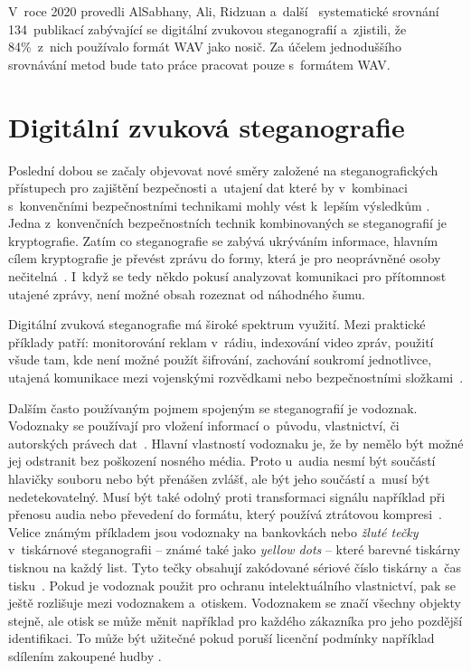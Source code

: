 V~roce 2020 provedli AlSabhany, Ali, Ridzuan a~další~\cite{AlSabhany2020}
systematické srovnání 134~publikací zabývající se digitální zvukovou
steganografií a~zjistili, že 84\%~z~nich používalo formát WAV jako nosič. Za
účelem jednoduššího srovnávání metod bude tato práce pracovat pouze s~formátem
WAV.

\section{Digitální zvuková steganografie}
\label{sec:digital-audio-steganography}

Poslední dobou se začaly objevovat nové směry založené na steganografických
přístupech pro zajištění bezpečnosti a~utajení dat které by v~kombinaci
s~konvenčními bezpečnostními technikami mohly vést k~lepším výsledkům
\cite{Djebbar2012}. Jedna z~konvenčních bezpečnostních technik kombinovaných se
steganografií je kryptografie. Zatím co steganografie se zabývá ukrýváním
informace, hlavním cílem kryptografie je převést zprávu do formy, která je pro
neoprávněné osoby nečitelná~\cite{AlSabhany2020}. I~když se tedy někdo pokusí
analyzovat komunikaci pro přítomnost utajené zprávy, není možné obsah rozeznat
od náhodného šumu.

Digitální zvuková steganografie má široké spektrum využití. Mezi praktické
příklady patří: monitorování reklam v~rádiu, indexování video zpráv, použití
všude tam, kde není možné použít šifrování, zachování soukromí jednotlivce,
utajená komunikace mezi vojenskými rozvědkami nebo bezpečnostními
složkami~\cite{Dutta2020}.

Dalším často používaným pojmem spojeným se steganografií je vodoznak. Vodoznaky
se používají pro vložení informací o~původu, vlastnictví, či autorských právech
dat~\cite{Djebbar2012}\cite{Dutta2020}\cite{Swanson1998}. Hlavní vlastností
vodoznaku je, že by nemělo být možné jej odstranit bez poškození nosného média.
Proto u~audia nesmí být součástí hlavičky souboru nebo být přenášen zvlášť, ale
být jeho součástí a~musí být nedetekovatelný. Musí být také odolný proti
transformaci signálu například při přenosu audia nebo převedení do formátu,
který používá ztrátovou kompresi~\cite{Swanson1998}. Velice známým příkladem
jsou vodoznaky na bankovkách nebo \textit{žluté tečky} v~tiskárnové
steganografii -- známé také jako \textit{yellow dots} -- které barevné tiskárny
tisknou na každý list. Tyto tečky obsahují zakódované sériové číslo tiskárny
a~čas tisku~\cite{Dutta2020}. Pokud je vodoznak použit pro ochranu
intelektuálního vlastnictví, pak se ještě rozlišuje mezi vodoznakem a~otiskem.
Vodoznakem se značí všechny objekty stejně, ale otisk se může měnit například
pro každého zákazníka pro jeho pozdější identifikaci. To může být užitečné
pokud poruší licenční podmínky například sdílením zakoupené hudby
\cite{Swanson1998}.

